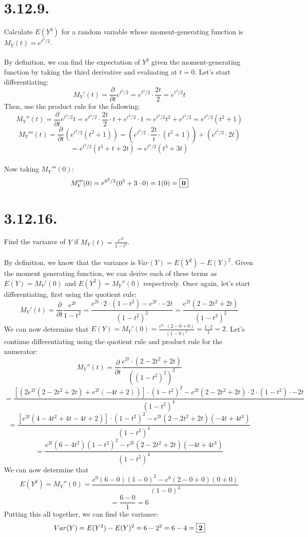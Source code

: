 \documentclass{article}
\begin{document}
\thispagestyle{firstpageheader}
{\Large 

\section*{3.12.9.}
Calculate \(E(Y^3)\) for a random variable whose moment-generating function is \(M_Y(t) = e^{t^2/2}\).
\\
\\
By definition, we can find the expectation of \(Y^3\) given the moment-generating function  by taking the third derivative and evaluating at \(t=0\). Let's start differentiating:
\\
\[
M_Y'(t) = \frac{\partial}{\partial t} e^{t^2/2} = e^{t^2/2} \cdot \frac{2t}{2} = e^{t^2/2}t
\]
Then, use the product rule for the following:
\[
M_Y''(t) = \frac{\partial}{\partial t} e^{t^2/2}t = e^{t^2/2} \cdot \frac{2t}{2} \cdot t + e^{t^2/2} \cdot 1 = e^{t^2/2}t^2 + e^{t^2/2} = e^{t^2/2}(t^2 + 1)
\]
\[
M_Y'''(t) = \frac{\partial}{\partial t} (e^{t^2/2}(t^2 + 1)) = (e^{t^2/2} \cdot \frac{2t}{t} \cdot (t^2 + 1)) + (e^{t^2/2} \cdot 2t) 
\]
\[
= e^{t^2/2}(t^3 + t + 2t) = e^{t^2/2}(t^3 + 3t)
\]
\\ 
Now taking \(M_Y'''(0)\):
\[
M_Y'''(0) = e^{0^2/2}(0^3 + 3 \cdot 0) = 1(0) = \fbox{\(\mathbf{0}\)}
\]

\section*{3.12.16.}
Find the variance of \(Y\) if \(M_Y(t) = \frac{e^{2t}}{1 - t^2}\).
\\
\\
By definition, we know that the variance is \(Var(Y) = E(Y^2) - E(Y)^2\). Given the moment generating function, we can derive each of these terms as \(E(Y) = M_Y'(0)\) and \(E(Y^2) = M_Y''(0)\) respectively. Once again, let's start differentiating, first using the quotient rule:
\[
M_Y'(t) = \frac{\partial}{\partial t} \frac{e^{2t}}{1 - t^2} = \frac{e^{2t} \cdot 2 \cdot (1-t^2) - e^{2t} \cdot -2t}{(1-t^2)^2} = \frac{e^{2t} (2 -2t^2 + 2t)}{(1-t^2)^2}
\]
We can now determine that \(E(Y) = M_Y'(0) = \frac{e^{0} \cdot (2 - 0 + 0)}{(1-0)^2} = \frac{1 \cdot 2}{1} = 2 \). 
Let's continue differentiating using the quotient rule and product rule for the numerator:
\[
M_Y''(t) = \frac{\partial}{\partial t} \frac{e^{2t} \cdot (2 -2t^2 + 2t)}{((1-t^2)^2)^2} 
\]
\[
= \frac{[(2e^{2t}(2 - 2t^2 + 2t) + e^{2t}(-4t + 2))] \cdot (1-t^2)^2 - e^{2t} (2 - 2t^2 + 2t) \cdot 2 \cdot (1 - t^2) \cdot -2t}{(1-t^2)^4}
\]
\[
= \frac{[e^{2t}(4 - 4t^2 + 4t - 4t + 2)] \cdot (1-t^2)^2 - e^{2t}(2 - 2t^2 + 2t)(-4t + 4t^3) }{(1-t^2)^4}
\]
\[
= \frac{e^{2t}(6 - 4t^2)(1-t^2)^2 - e^{2t}(2 - 2t^2 + 2t)(-4t + 4t^3) }{(1-t^2)^4}
\]
We can now determine that 
\[
E(Y^2) = M_Y''(0) = \frac{e^{0}(6 - 0)(1 - 0)^2 - e^{0}(2 - 0 + 0)(0 + 0) }{(1 - 0)^4}
\]
\[
= \frac{6 - 0}{1} = 6
\]
Putting this all together, we can find the variance:
\[
Var(Y) = E(Y^2) - E(Y)^2 = 6 - 2^2 = 6 - 4 = \fbox{\(\mathbf{2}\)}
\]

}
\end{document}

